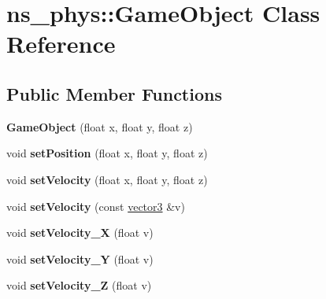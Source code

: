 \hypertarget{classns__phys_1_1_game_object}{}\section{ns\+\_\+phys\+:\+:Game\+Object Class Reference}
\label{classns__phys_1_1_game_object}
\subsection*{Public Member Functions}
\begin{DoxyCompactItemize}
\item 
{\bfseries Game\+Object} (float x, float y, float z)\hypertarget{classns__phys_1_1_game_object_a66ad4ac7e9ebb8f24d5ee6131717758b}{}\label{classns__phys_1_1_game_object_a66ad4ac7e9ebb8f24d5ee6131717758b}

\item 
void {\bfseries set\+Position} (float x, float y, float z)\hypertarget{classns__phys_1_1_game_object_a860548819ea33328a828ded2c32d06b3}{}\label{classns__phys_1_1_game_object_a860548819ea33328a828ded2c32d06b3}

\item 
void {\bfseries set\+Velocity} (float x, float y, float z)\hypertarget{classns__phys_1_1_game_object_a9a84e6ded66369fa363e4bfcfa3353f0}{}\label{classns__phys_1_1_game_object_a9a84e6ded66369fa363e4bfcfa3353f0}

\item 
void {\bfseries set\+Velocity} (const \hyperlink{classns__phys_1_1vector3}{vector3} \&v)\hypertarget{classns__phys_1_1_game_object_acf44538ce8d0ec99ed468b336dbbcb2b}{}\label{classns__phys_1_1_game_object_acf44538ce8d0ec99ed468b336dbbcb2b}

\item 
void {\bfseries set\+Velocity\+\_\+X} (float v)\hypertarget{classns__phys_1_1_game_object_a071ac6057318412015283a3c26dccc6f}{}\label{classns__phys_1_1_game_object_a071ac6057318412015283a3c26dccc6f}

\item 
void {\bfseries set\+Velocity\+\_\+Y} (float v)\hypertarget{classns__phys_1_1_game_object_a1222a7a4c39ff7b360eb1156abca9a23}{}\label{classns__phys_1_1_game_object_a1222a7a4c39ff7b360eb1156abca9a23}

\item 
void {\bfseries set\+Velocity\+\_\+Z} (float v)\hypertarget{classns__phys_1_1_game_object_a4a62810667004b52bc535fdf49683306}{}\label{classns__phys_1_1_game_object_a4a62810667004b52bc535fdf49683306}


\end{DoxyCompactItemize}
